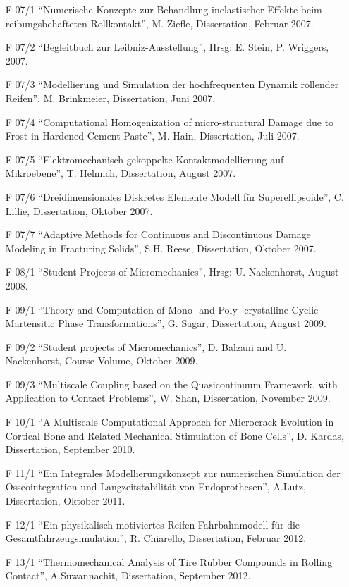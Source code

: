 \begin{itemize}
    \item[F 07/1] ``Numerische Konzepte zur Behandlung inelastischer Effekte beim reibungsbehafteten Rollkontakt”, M. Ziefle, Dissertation, Februar 2007.
    \item[F 07/2] ``Begleitbuch zur Leibniz-Ausstellung”, Hrsg: E. Stein, P. Wriggers, 2007.
    \item[F 07/3] ``Modellierung und Simulation der hochfrequenten Dynamik rollender Reifen”, M. Brinkmeier, Dissertation, Juni 2007.
    \item[F 07/4] ``Computational Homogenization of micro-structural Damage due to Frost in Hardened Cement Paste”, M. Hain, Dissertation, Juli 2007.
    \item[F 07/5] ``Elektromechanisch gekoppelte Kontaktmodellierung auf Mikroebene”, T. Helmich, Dissertation, August 2007.
    \item[F 07/6] ``Dreidimensionales Diskretes Elemente Modell für Superellipsoide”, C. Lillie, Dissertation, Oktober 2007.
    \item[F 07/7] ``Adaptive Methods for Continuous and Discontinuous Damage Modeling in Fracturing Solids”, S.H. Reese, Dissertation, Oktober 2007.
    \item[F 08/1] ``Student Projects of Micromechanics”, Hrsg: U. Nackenhorst, August 2008.
    \item[F 09/1] ``Theory and Computation of Mono- and Poly- crystalline Cyclic Martensitic Phase Transformations”, G. Sagar, Dissertation, August 2009.
    \item[F 09/2] ``Student projects of Micromechanics”, D. Balzani and U. Nackenhorst, Course Volume, Oktober 2009.
    \item[F 09/3] ``Multiscale Coupling based on the Quasicontinuum Framework, with Application to Contact Problems”, W. Shan, Dissertation, November 2009.
    \item[F 10/1] ``A Multiscale Computational Approach for Microcrack Evolution in Cortical Bone and Related Mechanical Stimulation of Bone Cells”, D. Kardas, Dissertation, September 2010. 
    \item[F 11/1] ``Ein Integrales Modellierungskonzept zur numerischen Simulation der Osseointegration und Langzeitstabilität von Endoprothesen”, A.Lutz, Dissertation, Oktober 2011.
    \item[F 12/1] ``Ein physikalisch motiviertes Reifen-Fahrbahnmodell für die Gesamtfahrzeugsimulation”, R. Chiarello, Dissertation, Februar 2012.
    \item[F 13/1] ``Thermomechanical Analysis of Tire Rubber Compounds in Rolling Contact”, A.Suwannachit, Dissertation, September 2012.

\end{itemize}
